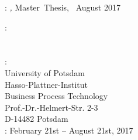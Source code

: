 \thispagestyle{empty}

\hfill

\vfill

\noindent\myName: \textit{\myTitle,} Master~Thesis, %
\textcopyright\ August 2017

\bigskip
%
\noindent{}: \\
\myProf \\
\mySupervisor \\
%
\medskip
%
\noindent {}: \\
University of Potsdam\\
Hasso-Plattner-Institut\\
Business Process Technology\\
Prof.-Dr.-Helmert-Str. 2-3\\
D-14482 Potsdam\\
%
\medskip
%
\noindent{}: February 21st -- August 21st, 2017 \\
